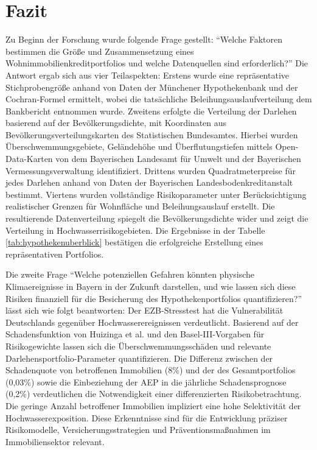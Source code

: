 \section{Fazit}\label{kap:7}
Zu Beginn der Forschung wurde folgende Frage gestellt: \enquote{Welche Faktoren bestimmen die Größe und Zusammensetzung eines Wohnimmobilienkreditportfolios und welche Datenquellen sind erforderlich?}  Die Antwort ergab sich aus vier Teilaspekten: Erstens wurde eine repräsentative Stichprobengröße anhand von Daten der Münchener Hypothekenbank und der Cochran-Formel ermittelt, wobei die tatsächliche Beleihungsauslaufverteilung dem Bankbericht entnommen wurde. Zweitens erfolgte die Verteilung der Darlehen basierend auf der Bevölkerungsdichte, mit Koordinaten aus Bevölkerungsverteilungskarten des Statistischen Bundesamtes. Hierbei wurden Überschwemmungsgebiete, Geländehöhe und Überflutungstiefen mittels Open-Data-Karten von \textcite{suche_postleitzahl} dem Bayerischen Landesamt für Umwelt und der Bayerischen Vermessungsverwaltung identifiziert. Drittens wurden Quadratmeterpreise für jedes Darlehen anhand von Daten der Bayerischen Landesbodenkreditanstalt bestimmt. Viertens wurden vollständige Risikoparameter unter Berücksichtigung realistischer Grenzen für Wohnfläche und Beleihungsauslauf erstellt. Die resultierende Datenverteilung spiegelt die Bevölkerungsdichte wider und zeigt die Verteilung in Hochwasserrisikogebieten. Die Ergebnisse in der Tabelle \ref{tab:hypothekenuberblick} bestätigen die erfolgreiche Erstellung eines repräsentativen Portfolios.

Die zweite Frage \enquote{Welche potenziellen Gefahren könnten physische Klimaereignisse in Bayern in der Zukunft darstellen, und wie lassen sich diese Risiken finanziell für die Besicherung des Hypothekenportfolios quantifizieren?} lässt sich wie folgt beantworten: Der \ac{EZB}-Stresstest hat die Vulnerabilität Deutschlands gegenüber Hochwasserereignissen verdeutlicht. Basierend auf der Schadensfunktion von Huizinga et al. und den Basel-III-Vorgaben für Risikogewichte lassen sich die Überschwemmungsschäden und relevante Darlehensportfolio-Parameter quantifizieren.  Die Differenz zwischen der Schadenquote von betroffenen Immobilien (8\%) und der des Gesamtportfolios (0,03\%) sowie die Einbeziehung der \ac{AEP} in die jährliche Schadensprognose (0,2\%) verdeutlichen die Notwendigkeit einer differenzierten Risikobetrachtung. Die geringe Anzahl betroffener Immobilien impliziert eine hohe Selektivität der Hochwasserexposition. Diese Erkenntnisse sind für die Entwicklung präziser Risikomodelle, Versicherungsstrategien und Präventionsmaßnahmen im Immobiliensektor relevant.

